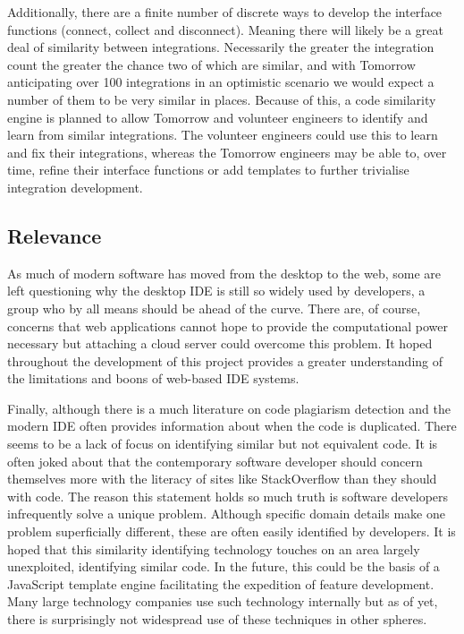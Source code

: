 \documentclass[jou,apacite]{apa6}
\begin{document}
Additionally, there are a finite number of discrete ways to develop the interface functions (connect, collect and disconnect). Meaning there will likely be a great deal of similarity between integrations. Necessarily the greater the integration count the greater the chance two of which are similar, and with Tomorrow anticipating over 100 integrations in an optimistic scenario we would expect a number of them to be very similar in places. Because of this, a code similarity engine is planned to allow Tomorrow and volunteer engineers to identify and learn from similar integrations. The volunteer engineers could use this to learn and fix their integrations, whereas the Tomorrow engineers may be able to, over time, refine their interface functions or add templates to further trivialise integration development.

\subsection{Relevance}
As much of modern software has moved from the desktop to the web, some are left questioning why the desktop IDE is still so widely used by developers, a group who by all means should be ahead of the curve. There are, of course, concerns that web applications cannot hope to provide the computational power necessary but attaching a cloud server could overcome this problem. It hoped throughout the development of this project provides a greater understanding of the limitations and boons of web-based IDE systems. 

Finally, although there is a much literature on code plagiarism detection and the modern IDE often provides information about when the code is duplicated. There seems to be a lack of focus on identifying similar but not equivalent code. It is often joked about that the contemporary software developer should concern themselves more with the literacy of sites like StackOverflow than they should with code. The reason this statement holds so much truth is software developers infrequently solve a unique problem. Although specific domain details make one problem superficially different, these are often easily identified by developers. It is hoped that this similarity identifying technology touches on an area largely unexploited, identifying similar code. In the future, this could be the basis of a JavaScript template engine facilitating the expedition of feature development. Many large technology companies use such technology internally but as of yet, there is surprisingly not widespread use of these techniques in other spheres.
\end{document}

